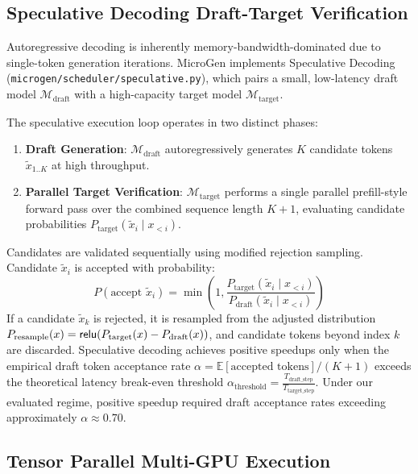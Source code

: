 \subsection{Speculative Decoding Draft-Target Verification}
\label{sec:opt_speculative}

Autoregressive decoding is inherently memory-bandwidth-dominated due to single-token generation iterations. \textsf{MicroGen} implements Speculative Decoding (\texttt{microgen/scheduler/speculative.py}), which pairs a small, low-latency draft model $\mathcal{M}_{\text{draft}}$ with a high-capacity target model $\mathcal{M}_{\text{target}}$.

The speculative execution loop operates in two distinct phases:
\begin{enumerate}
    \item \textbf{Draft Generation}: $\mathcal{M}_{\text{draft}}$ autoregressively generates $K$ candidate tokens $\tilde{x}_{1..K}$ at high throughput.
    \item \textbf{Parallel Target Verification}: $\mathcal{M}_{\text{target}}$ performs a single parallel prefill-style forward pass over the combined sequence length $K+1$, evaluating candidate probabilities $P_{\text{target}}(\tilde{x}_i \mid x_{<i})$.
\end{enumerate}

Candidates are validated sequentially using modified rejection sampling. Candidate $\tilde{x}_i$ is accepted with probability:
\begin{equation}
    P(\text{accept } \tilde{x}_i) = \min\left(1, \frac{P_{\text{target}}(\tilde{x}_i \mid x_{<i})}{P_{\text{draft}}(\tilde{x}_i \mid x_{<i})}\right)
\end{equation}
If a candidate $\tilde{x}_k$ is rejected, it is resampled from the adjusted distribution $P_{\text{resample}}(x) = \text{\textsf{relu}}(P_{\text{target}}(x) - P_{\text{draft}}(x))$, and candidate tokens beyond index $k$ are discarded. Speculative decoding achieves positive speedups only when the empirical draft token acceptance rate $\alpha = \mathbb{E}[\text{accepted tokens}] / (K+1)$ exceeds the theoretical latency break-even threshold $\alpha_{\text{threshold}} = \frac{T_{\text{draft\_step}}}{T_{\text{target\_step}}}$. Under our evaluated regime, positive speedup required draft acceptance rates exceeding approximately $\alpha \approx 0.70$.

\subsection{Tensor Parallel Multi-GPU Execution}
\label{sec:opt_tensor_parallel}

